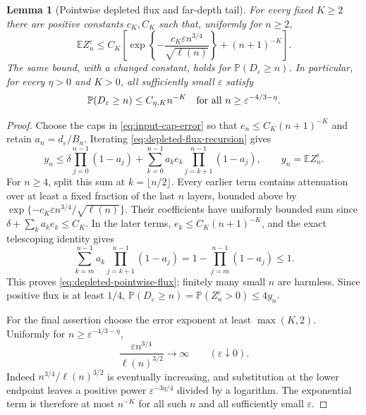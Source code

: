 \documentclass[11pt]{article}
\numberwithin{equation}{section}
\newtheorem{lemma}[theorem]{Lemma}
\theoremstyle{definition}
\newcommand{\E}{\mathbb E}
\newcommand{\Prob}{\mathbb P}
\begin{document}
\begin{lemma}[Pointwise depleted flux and far-depth tail]\label{lem:depleted-depth-tail}
For every fixed $K\ge2$ there are positive constants $c_K,C_K$ such that, uniformly for $n\ge2$,
\begin{equation}\label{eq:depleted-pointwise-flux}
 \E Z_n^\varepsilon\le C_K\left[
 \exp\left\{-\frac{c_K\varepsilon n^{3/4}}{\sqrt{\ell(n)}}\right\}
 +(n+1)^{-K}\right].
\end{equation}
The same bound, with a changed constant, holds for $\Prob(D_\varepsilon\ge n)$. In particular, for every $\eta>0$ and $K>0$, all sufficiently small $\varepsilon$ satisfy
\begin{equation}\label{eq:depleted-depth-polynomial}
 \Prob(D_\varepsilon\ge n)\le C_{\eta,K}n^{-K}
 \quad\hbox{for all }n\ge\varepsilon^{-4/3-\eta}.
\end{equation}
\end{lemma}
\begin{proof}
Choose the caps in \eqref{eq:input-cap-error} so that $e_n\le C_K(n+1)^{-K}$ and retain $a_n=d_\varepsilon/B_n$. Iterating \eqref{eq:depleted-flux-recursion} gives
\[
 y_n\le\delta\prod_{j=0}^{n-1}(1-a_j)
 +\sum_{k=0}^{n-1}a_ke_k\prod_{j=k+1}^{n-1}(1-a_j),
 \qquad y_n=\E Z_n^\varepsilon.
\]
For $n\ge4$, split this sum at $k=\lfloor n/2\rfloor$. Every earlier term contains attenuation over at least a fixed fraction of the last $n$ layers, bounded above by $\exp\{-c_K\varepsilon n^{3/4}/\sqrt{\ell(n)}\}$. Their coefficients have uniformly bounded sum since $\delta+\sum_k a_ke_k\le C_K$. In the later terms, $e_k\le C_K(n+1)^{-K}$, and the exact telescoping identity gives
\[
 \sum_{k=m}^{n-1}a_k\prod_{j=k+1}^{n-1}(1-a_j)
 =1-\prod_{j=m}^{n-1}(1-a_j)\le1.
\]
This proves \eqref{eq:depleted-pointwise-flux}; finitely many small $n$ are harmless. Since positive flux is at least $1/4$,
$\Prob(D_\varepsilon\ge n)=\Prob(Z_n^\varepsilon>0)\le4y_n$.

For the final assertion choose the error exponent at least $\max(K,2)$. Uniformly for $n\ge\varepsilon^{-4/3-\eta}$,
\[
 \frac{\varepsilon n^{3/4}}{\ell(n)^{3/2}}\longrightarrow\infty
 \qquad(\varepsilon\downarrow0).
\]
Indeed $n^{3/4}/\ell(n)^{3/2}$ is eventually increasing, and substitution at the lower endpoint leaves a positive power $\varepsilon^{-3\eta/4}$ divided by a logarithm. The exponential term is therefore at most $n^{-K}$ for all such $n$ and all sufficiently small $\varepsilon$.
\end{proof}
\end{document}
